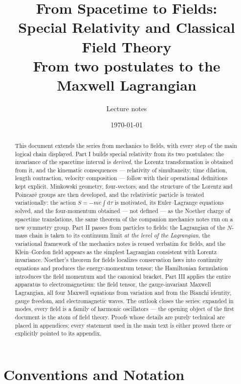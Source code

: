\documentclass[11pt]{article}
\title{\bfseries From Spacetime to Fields:\\
Special Relativity and Classical Field Theory\\[4pt]
\large From two postulates to the Maxwell Lagrangian}
\author{Lecture notes}
\date{\today}
\theoremstyle{plain}
\theoremstyle{definition}
\theoremstyle{remark}
\newcommand{\dd}{\mathrm{d}}
\begin{document}
\maketitle

\begin{abstract}
\noindent
This document extends the series from mechanics to fields, with every step
of the main logical chain displayed. Part I builds special relativity from
its two postulates: the invariance of the spacetime interval is
\emph{derived}, the Lorentz transformation is obtained from it, and the
kinematic consequences --- relativity of simultaneity, time dilation,
length contraction, velocity composition --- follow with their operational
definitions kept explicit. Minkowski geometry, four-vectors, and the
structure of the Lorentz and Poincar\'e groups are then developed, and the
relativistic particle is treated variationally: the action
$S = -mc\int\dd\tau$ is motivated, its Euler--Lagrange equations solved,
and the four-momentum obtained --- not defined --- as the Noether charge
of spacetime translations, the same theorem of the companion mechanics
notes run on a new symmetry group. Part II passes from particles to
fields: the Lagrangian of the $N$-mass chain is taken to its continuum
limit \emph{at the level of the Lagrangian}, the variational framework of
the mechanics notes is reused verbatim for fields, and the Klein--Gordon
field appears as the simplest Lagrangian consistent with Lorentz
invariance. Noether's theorem for fields localizes conservation laws into
continuity equations and produces the energy-momentum tensor; the
Hamiltonian formulation introduces the field momentum and the canonical
bracket. Part III applies the entire apparatus to electromagnetism: the
field tensor, the gauge-invariant Maxwell Lagrangian, all four Maxwell
equations from variation and from the Bianchi identity, gauge freedom, and
electromagnetic waves. The outlook closes the series: expanded in modes,
every field is a family of harmonic oscillators --- the opening object of
the first document is the atom of field theory. Proofs whose details are
purely technical are placed in appendices; every statement used in the
main text is either proved there or explicitly pointed to its appendix.
\end{abstract}

\clearpage
\tableofcontents
\clearpage

\section{Conventions and Notation}
\label{sec:conventions}
\end{document}
